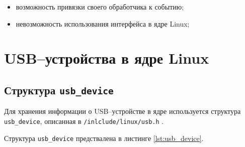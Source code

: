 \begin{itemize}
	\item возможность привязки своего обработчика к событию;
	\item невозможность использования интерфейса в ядре Linux;
\end{itemize}

\section{USB--устройства в ядре Linux}

\subsection{Структура \texttt{usb\_device}}

Для хранения информации о USB--устройстве в ядре используется структура \texttt{usb\_device}, описанная в \texttt{/inlclude/linux/usb.h} \cite{usb_device}.

Структура \texttt{usb\_device} предствалена в листинге \ref{lst:usb_device}.


